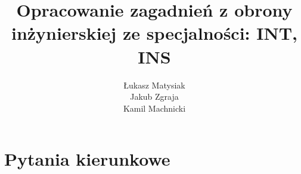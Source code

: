 \documentclass[11pt,a4paper]{article}
\title{Opracowanie zagadnień z obrony inżynierskiej ze specjalności: INT, INS}
\author{Łukasz Matysiak\\Jakub Zgraja\\Kamil Machnicki}
\makeatletter
\newcommand{\University}{Politechnika Wrocławska}
\newcommand{\Department}{Wydział Elektroniki}
\newcommand{\Faculty}{Informatyka}
\renewcommand{\maketitle}{
\begin{titlepage}
    \begin{center}
        \huge\textsc{{\University}}\\
        \Large\textsc{{\Department}}\\
        \Large\textsc{{\Faculty}}\par
        
        \vspace{5cm}
        \huge\textbf{\@title}\par
        
        \vspace{6cm}
        \large\textit{Autorzy:}\\ 
        \Large\textbf{\@author}\par 
        
        \vspace{4.5cm}
        \small Wrocław \\
        \small \@date \\
    \end{center}
\end{titlepage}
}
\makeatother
\begin{document}
\tableofcontents
\newpage

\part{Pytania kierunkowe}



\end{document}
